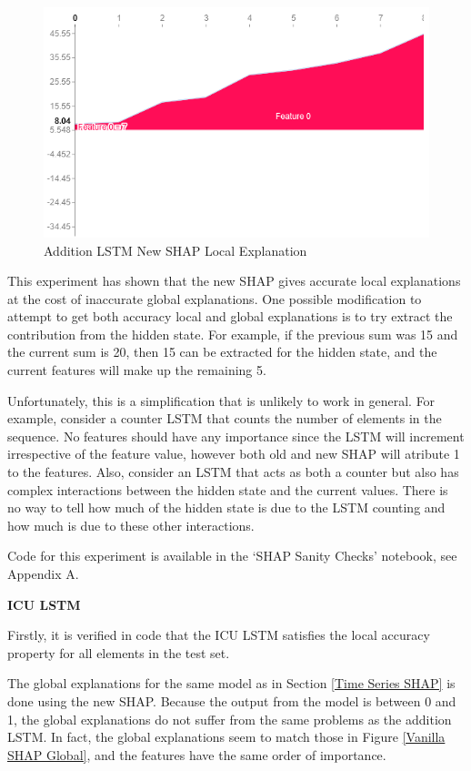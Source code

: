 \documentclass[12pt]{article}
\begin{document}
\begin{figure}[H]
\centering\caption{Addition LSTM New SHAP Local Explanation}
\includegraphics[scale=0.6]{Sanity New Local.png}
\end{figure}

This experiment has shown that the new SHAP gives accurate local explanations at the cost of inaccurate global explanations. One possible modification to attempt to get both accuracy local and global explanations is to try extract the contribution from the hidden state. For example, if the previous sum was 15 and the current sum is 20, then 15 can be extracted for the hidden state, and the current features will make up the remaining 5. 

Unfortunately, this is a simplification that is unlikely to work in general. For example, consider a counter LSTM that counts the number of elements in the sequence. No features should have any importance since the LSTM will increment irrespective of the feature value, however both old and new SHAP will atribute 1 to the features. Also, consider an LSTM that acts as both a counter but also has complex interactions between the hidden state and the current values. There is no way to tell how much of the hidden state is due to the LSTM counting and how much is due to these other interactions.

Code for this experiment is available in the `SHAP Sanity Checks' notebook, see Appendix A.

\textbf{ICU LSTM}

Firstly, it is verified in code that the ICU LSTM satisfies the local accuracy property for all elements in the test set. 

The global explanations for the same model as in Section \ref{Time Series SHAP} is done using the new SHAP. Because the output from the model is between 0 and 1, the global explanations do not suffer from the same problems as the addition LSTM. In fact, the global explanations seem to match those in Figure \ref{Vanilla SHAP Global}, and the features have the same order of importance. 
\end{document}
